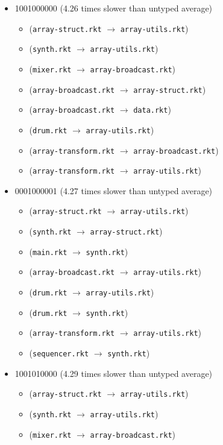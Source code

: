 \documentclass{article}
\newcommand{\mono}[1]{\texttt{#1}}
\begin{document}
\begin{itemize}
\begin{itemize}
  \end{itemize}
\item 1001000000 (4.26 times slower than untyped average)
  \begin{itemize}
  \item (\mono{array-struct.rkt} $\rightarrow$ \mono{array-utils.rkt})
  \item (\mono{synth.rkt} $\rightarrow$ \mono{array-utils.rkt})
  \item (\mono{mixer.rkt} $\rightarrow$ \mono{array-broadcast.rkt})
  \item (\mono{array-broadcast.rkt} $\rightarrow$ \mono{array-struct.rkt})
  \item (\mono{array-broadcast.rkt} $\rightarrow$ \mono{data.rkt})
  \item (\mono{drum.rkt} $\rightarrow$ \mono{array-utils.rkt})
  \item (\mono{array-transform.rkt} $\rightarrow$ \mono{array-broadcast.rkt})
  \item (\mono{array-transform.rkt} $\rightarrow$ \mono{array-utils.rkt})
  \end{itemize}
\item 0001000001 (4.27 times slower than untyped average)
  \begin{itemize}
  \item (\mono{array-struct.rkt} $\rightarrow$ \mono{array-utils.rkt})
  \item (\mono{synth.rkt} $\rightarrow$ \mono{array-struct.rkt})
  \item (\mono{main.rkt} $\rightarrow$ \mono{synth.rkt})
  \item (\mono{array-broadcast.rkt} $\rightarrow$ \mono{array-utils.rkt})
  \item (\mono{drum.rkt} $\rightarrow$ \mono{array-utils.rkt})
  \item (\mono{drum.rkt} $\rightarrow$ \mono{synth.rkt})
  \item (\mono{array-transform.rkt} $\rightarrow$ \mono{array-utils.rkt})
  \item (\mono{sequencer.rkt} $\rightarrow$ \mono{synth.rkt})
  \end{itemize}
\item 1001010000 (4.29 times slower than untyped average)
  \begin{itemize}
  \item (\mono{array-struct.rkt} $\rightarrow$ \mono{array-utils.rkt})
  \item (\mono{synth.rkt} $\rightarrow$ \mono{array-utils.rkt})
  \item (\mono{mixer.rkt} $\rightarrow$ \mono{array-broadcast.rkt})

\end{itemize}
\end{itemize}
\end{document}
